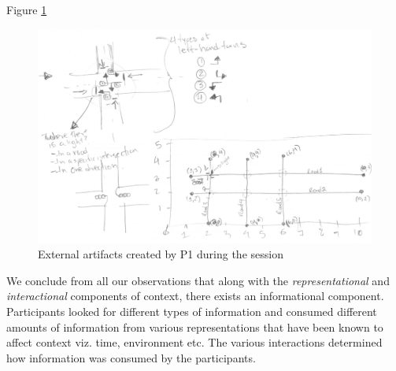 Figure \ref{P4Sketch}

\begin{figure}
\includegraphics[width=\columnwidth]{figures/P4sketches}
\caption{External artifacts created by P1 during the session}
\label{P4Sketch}
\end{figure}

We conclude from all our observations that along with the \textit{representational} and \textit{interactional} components of context, there exists an informational component. Participants looked for different types of information and consumed different amounts of information from various representations that have been known to affect context viz. time, environment etc. The various interactions determined how information was consumed by the participants. 
